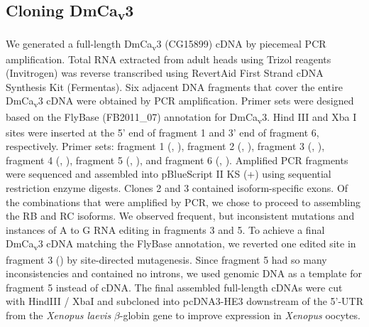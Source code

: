 \subsection*{Cloning DmCa\textsubscript{v}3}

We generated a full-length DmCa\textsubscript{v}3 (CG15899) cDNA by piecemeal PCR amplification.
Total RNA extracted from adult heads using Trizol reagents (Invitrogen) was reverse transcribed using RevertAid First Strand cDNA Synthesis Kit (Fermentas).
Six adjacent DNA fragments that cover the entire DmCa\textsubscript{v}3 cDNA were obtained by PCR amplification. 
Primer sets were designed based on the FlyBase (FB2011\_07) annotation for DmCa\textsubscript{v}3. 
Hind III and Xba I sites were inserted at the 5' end of fragment 1 and 3' end of fragment 6, respectively.
Primer sets: fragment 1 (, ), fragment 2 (, ), fragment 3 (, ), fragment 4 (, ), fragment 5 (, ), and fragment 6 (, ).
Amplified PCR fragments were sequenced and assembled into pBlueScript II KS (+) using sequential restriction enzyme digests.
Clones 2 and 3 contained isoform-specific exons.
Of the combinations that were amplified by PCR, we chose to proceed to assembling the RB and RC isoforms.
We observed frequent, but inconsistent mutations and instances of A to G RNA editing in fragments 3 and 5.
To achieve a final DmCa\textsubscript{v}3 cDNA matching the FlyBase annotation, we reverted one edited site in fragment 3 () by site-directed mutagenesis.
Since fragment 5 had so many inconsistencies and contained no introns, we used genomic DNA as a template for fragment 5 instead of cDNA.
The final assembled full-length cDNAs were cut with HindIII / XbaI and subcloned into pcDNA3-HE3 downstream of the 5'-UTR from the \emph{Xenopus laevis} $\beta$-globin gene to improve expression in \emph{Xenopus} oocytes.

